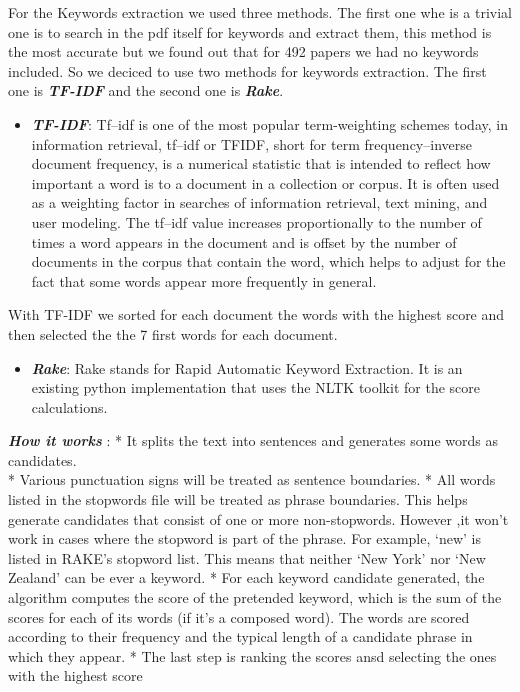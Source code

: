 \documentclass[journal,twocolumn]{IEEEtran}
\providecommand{\tightlist}{%
      \setlength{\itemsep}{0pt}\setlength{\parskip}{0pt}}
\begin{document}
    For the Keywords extraction we used three methods. The first one whe is
a trivial one is to search in the pdf itself for keywords and extract
them, this method is the most accurate but we found out that for 492
papers we had no keywords included. So we deciced to use two methods for
keywords extraction. The first one is \textbf{\emph{TF-IDF}} and the
second one is \textbf{\emph{Rake}}.

    \begin{itemize}
\tightlist
\item
  \textbf{\emph{TF-IDF}}: Tf--idf is one of the most popular
  term-weighting schemes today, in information retrieval, tf--idf or
  TFIDF, short for term frequency--inverse document frequency, is a
  numerical statistic that is intended to reflect how important a word
  is to a document in a collection or corpus. It is often used as a
  weighting factor in searches of information retrieval, text mining,
  and user modeling. The tf--idf value increases proportionally to the
  number of times a word appears in the document and is offset by the
  number of documents in the corpus that contain the word, which helps
  to adjust for the fact that some words appear more frequently in
  general.
\end{itemize}

    With TF-IDF we sorted for each document the words with the highest score
and then selected the the 7 first words for each document.

    \begin{itemize}
\tightlist
\item
  \textbf{\emph{Rake}}: Rake stands for Rapid Automatic Keyword
  Extraction. It is an existing python implementation that uses the NLTK
  toolkit for the score calculations.
\end{itemize}

\textbf{\emph{How it works}} : * It splits the text into sentences and
generates some words as candidates.\\
* Various punctuation signs will be treated as sentence boundaries. *
All words listed in the stopwords file will be treated as phrase
boundaries. This helps generate candidates that consist of one or more
non-stopwords. However ,it won't work in cases where the stopword is
part of the phrase. For example, `new' is listed in RAKE's stopword
list. This means that neither `New York' nor `New Zealand' can be ever a
keyword. * For each keyword candidate generated, the algorithm computes
the score of the pretended keyword, which is the sum of the scores for
each of its words (if it's a composed word). The words are scored
according to their frequency and the typical length of a candidate
phrase in which they appear. * The last step is ranking the scores ansd
selecting the ones with the highest score
\end{document}
